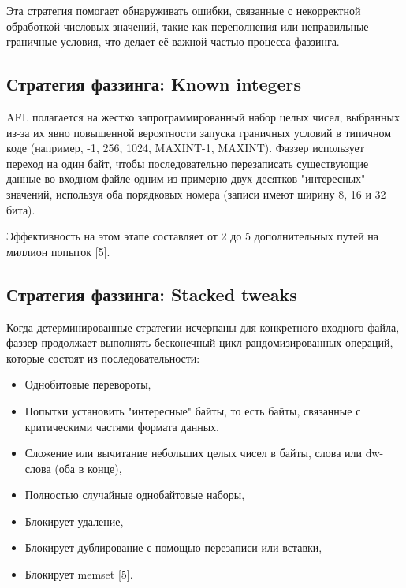 Эта стратегия помогает обнаруживать ошибки, связанные с некорректной обработкой числовых значений, такие как переполнения или неправильные граничные условия, что делает её важной частью процесса фаззинга.


\subsection{Стратегия фаззинга: Known integers} \label{ch2:known-ints}
AFL полагается на жестко запрограммированный набор целых чисел, выбранных из-за их явно повышенной вероятности запуска граничных условий в типичном коде (например, -1, 256, 1024, MAX\textunderscore INT-1, MAX\textunderscore INT). Фаззер использует переход на один байт, чтобы последовательно перезаписать существующие данные во входном файле одним из примерно двух десятков "интересных" значений, используя оба порядковых номера (записи имеют ширину 8, 16 и 32 бита).


Эффективность на этом этапе составляет от 2 до 5 дополнительных путей на миллион попыток [5].

\subsection{Стратегия фаззинга: Stacked tweaks} \label{ch2:stacked-tweaks}
Когда детерминированные стратегии исчерпаны для конкретного входного файла, фаззер продолжает выполнять бесконечный цикл рандомизированных операций, которые состоят из последовательности:

\begin{itemize}
	\item Однобитовые перевороты,
	\item Попытки установить "интересные" байты, то есть байты, связанные с критическими частями формата данных.
	\item Сложение или вычитание небольших целых чисел в байты, слова или dw-слова (оба в конце),
	\item Полностью случайные однобайтовые наборы,
	\item Блокирует удаление,
	\item Блокирует дублирование с помощью перезаписи или вставки,
	\item Блокирует memset [5].
\end{itemize}

